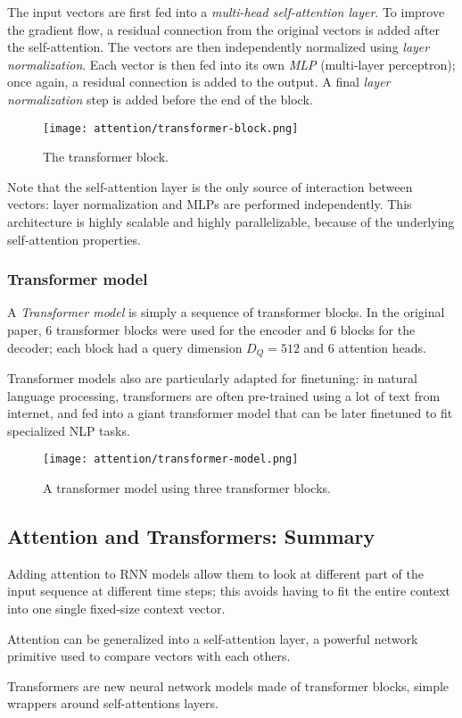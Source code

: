 The input vectors are first fed into a \emph{multi-head self-attention layer}. To improve the gradient flow, a residual connection from the original vectors is added after the self-attention. The vectors are then independently normalized using \emph{layer normalization}. Each vector is then fed into its own \emph{MLP} (multi-layer perceptron); once again, a residual connection is added to the output. A final \emph{layer normalization} step is added before the end of the block.
\begin{figure}[H]
    \centering
    \texttt{[image: attention/transformer-block.png]}
    \caption{The transformer block.}
\end{figure}
Note that the self-attention layer is the only source of interaction between vectors: layer normalization and MLPs are performed independently. This architecture is highly scalable and highly parallelizable, because of the underlying self-attention properties.

\subsubsection{Transformer model}
A \emph{Transformer model} is simply a sequence of transformer blocks. In the original paper, 6 transformer blocks were used for the encoder and 6 blocks for the decoder; each block had a query dimension $D_Q=512$ and 6 attention heads.

Transformer models also are particularly adapted for finetuning: in natural language processing, transformers are often pre-trained using a lot of text from internet, and fed into a giant transformer model that can be later finetuned to fit specialized NLP tasks.
\begin{figure}[H]
    \centering
    \texttt{[image: attention/transformer-model.png]}
    \caption{A transformer model using three transformer blocks.}
\end{figure}

\subsection*{Attention and Transformers: Summary}
Adding attention to RNN models allow them to look at different part of the input sequence at different time steps; this avoids having to fit the entire context into one single fixed-size context vector.

Attention can be generalized into a self-attention layer, a powerful network primitive used to compare vectors with each others.

Transformers are new neural network models made of transformer blocks, simple wrappers around self-attentions layers.


\newpage